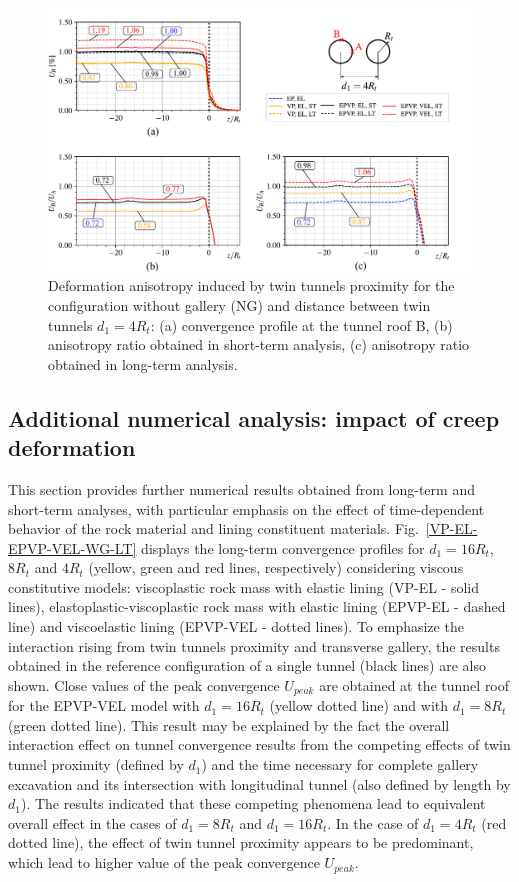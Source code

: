 \documentclass[a4paper,fleqn]{cas-sc}
\begin{document}
\begin{figure}[h!]
	\centering
	\includegraphics[scale=0.65]{Convergence Profiles - UB - UAUB - $d_1=4R_t - ST_Lt$.pdf}
	\caption{Deformation anisotropy induced by twin tunnels proximity for the configuration without gallery (NG) and distance between twin tunnels $d_1=4R_t$: (a) convergence profile at the tunnel roof B, (b) anisotropy ratio obtained in short-term analysis, (c) anisotropy ratio obtained in long-term analysis.}
	\label{UB-UAUB-D1_4RT}
\end{figure}
\FloatBarrier

\subsection{Additional numerical analysis: impact of creep deformation}\label{}

This section provides further numerical results obtained from long-term and short-term analyses, with particular emphasis on the effect of time-dependent behavior of the rock material and lining constituent materials. Fig.~\ref{VP-EL-EPVP-VEL-WG-LT} displays the long-term convergence profiles for $d_1=16R_t$, $8R_t$ and $4R_t$ (yellow, green and red lines, respectively) considering viscous constitutive models: viscoplastic rock mass with elastic lining (VP-EL - solid lines), elastoplastic-viscoplastic rock mass with elastic lining (EPVP-EL - dashed line) and viscoelastic lining (EPVP-VEL - dotted lines). To emphasize the interaction rising from twin tunnels proximity and transverse gallery, the results obtained in the reference configuration of a single tunnel (black lines) are also shown. Close values of the peak convergence  $U_{peak}$ are obtained at the tunnel roof for the EPVP-VEL model with $d_1=16R_t$ (yellow dotted line) and with $d_1=8R_t$ (green dotted line). This result may be explained by the fact the overall interaction effect on tunnel convergence results from the competing effects of twin tunnel proximity (defined by $d_1$) and the time necessary for complete gallery excavation and its intersection with longitudinal tunnel (also defined by length by $d_1$). The results indicated that these competing phenomena lead to equivalent overall effect in the cases of $d_1=8R_t$ and $d_1=16R_t$. In the case of $d_1=4R_t$ (red dotted line), the effect of twin tunnel proximity appears to be predominant, which lead to higher value of the peak convergence  $U_{peak}$.
\end{document}
